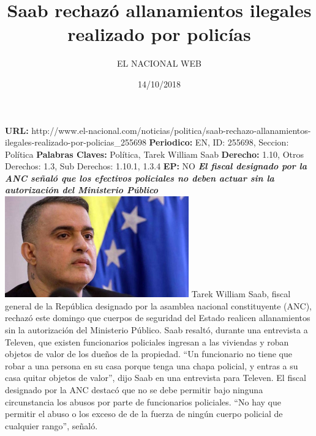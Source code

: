 \documentclass{article}%
\title{\textbf{Saab rechazó allanamientos ilegales realizado por policías}}%
\author{EL NACIONAL WEB}%
\date{14/10/2018}%
\begin{document}
%
\normalsize%
\maketitle%
\textbf{URL: }%
http://www.el{-}nacional.com/noticias/politica/saab{-}rechazo{-}allanamientos{-}ilegales{-}realizado{-}por{-}policias\_255698\newline%
%
\textbf{Periodico: }%
EN, %
ID: %
255698, %
Seccion: %
Política\newline%
%
\textbf{Palabras Claves: }%
Política, Tarek William Saab\newline%
%
\textbf{Derecho: }%
1.10, %
Otros Derechos: %
1.3, %
Sub Derechos: %
1.10.1, 1.3.4\newline%
%
\textbf{EP: }%
NO\newline%
\newline%
%
\textbf{\textit{El fiscal designado por la ANC señaló que los efectivos policiales no deben actuar sin la autorización del Ministerio Público}}%
\newline%
\newline%
%
\includegraphics[width=300px]{220.jpg}%
\newline%
%
Tarek William Saab, fiscal general de la República designado por la asamblea nacional constituyente (ANC), rechazó este domingo que cuerpos de seguridad del Estado realicen allanamientos sin la autorización del Ministerio Público.%
\newline%
%
Saab resaltó, durante una entrevista a Televen, que existen funcionarios policiales ingresan a las viviendas y roban objetos de valor de los dueños de la propiedad.%
\newline%
%
“Un funcionario no tiene que robar a una persona en su casa porque tenga una chapa policial, y entras a su casa quitar objetos de valor”, dijo Saab en una entrevista para Televen.%
\newline%
%
El fiscal designado por la ANC destacó que no se debe permitir bajo ninguna circunstancia los abusos por parte de funcionarios policiales.%
\newline%
%
“No hay que permitir el abuso o los exceso de de la fuerza de ningún cuerpo policial de cualquier rango”, señaló.%
\newline%
%
\end{document}
